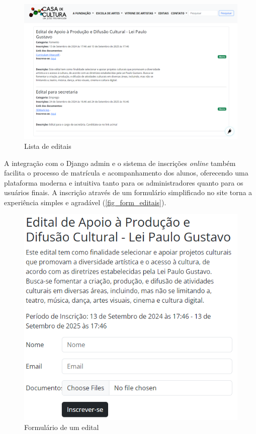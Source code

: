 \begin{figure}[htb]
	\caption{\label{fig_lista_editais}Lista de editais}
	\begin{center}
	    \includegraphics[scale=0.4]{./img/lista_editais.png}
	\end{center}
\end{figure}

A integração com o Django admin e o sistema de inscrições \textit{online} também facilita o processo de matrícula e acompanhamento dos alunos, oferecendo uma plataforma moderna e intuitiva tanto para os administradores quanto para os usuários finais. A inscrição através de um formulário simplificado no site torna a experiência simples e agradável (\autoref{fig_form_editais}).

\begin{figure}[htb]
	\caption{\label{fig_form_editais}Formulário de um edital}
	\begin{center}
	    \includegraphics[scale=0.5]{./img/form_edital.png}
	\end{center}
\end{figure}

